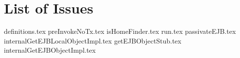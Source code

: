 \section{List of Issues} %
\label{sec:list_of_issues}
{definitions.tex}
{preInvokeNoTx.tex}
{isHomeFinder.tex}
{run.tex}
{passivateEJB.tex}
{internalGetEJBLocalObjectImpl.tex}
{getEJBObjectStub.tex}
{internalGetEJBObjectImpl.tex}
